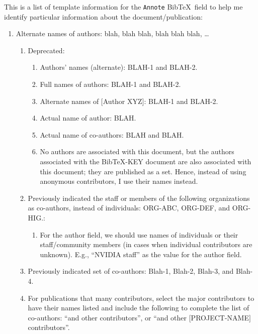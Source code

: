 \documentclass[letter,12pt]{article}
\begin{document}
This is a list of template information for the {\tt Annote} {\sc Bib}\TeX\ field to help me identify particular information about the document/publication: \vspace{-0.3cm}
\begin{enumerate} \itemsep -4pt
\item Alternate names of authors: blah, blah blah, blah blah blah, \dots \vspace{-0.3cm}
	\begin{enumerate} \itemsep -2pt
	\item Deprecated: \vspace{-0.2cm}
		\begin{enumerate} \itemsep -2pt
		\item Authors' names (alternate): BLAH-1 and BLAH-2.
		\item Full names of authors: BLAH-1 and BLAH-2.
		\item Alternate names of $[$Author XYZ$]$: BLAH-1 and BLAH-2.
		\item Actual name of author: BLAH.
		\item Actual name of co-authors: BLAH and BLAH.
		\item No authors are associated with this document, but the authors associated with the BibTeX-KEY document are also associated with this document; they are published as a set. Hence, instead of using anonymous contributors, I use their names instead.
		\end{enumerate}
	\item Previously indicated the staff or members of the following organizations as co-authors, instead of individuals: ORG-ABC, ORG-DEF, and ORG-HIG.: \vspace{-0.2cm}
		\begin{enumerate} \itemsep -2pt
		\item For the author field, we should use names of individuals or their staff/community members (in cases when individual contributors are unknown). E.g., ``NVIDIA staff'' as the value for the author field.
		\end{enumerate}
	\item Previously indicated set of co-authors: Blah-1, Blah-2, Blah-3, and Blah-4.
	\item For publications that many contributors, select the major contributors to have their names listed and include the following to complete the list of co-authors: ``and other contributors'', or ``and other $[$PROJECT-NAME$]$ contributors''.
	\end{enumerate}

\end{enumerate}
\end{document}

